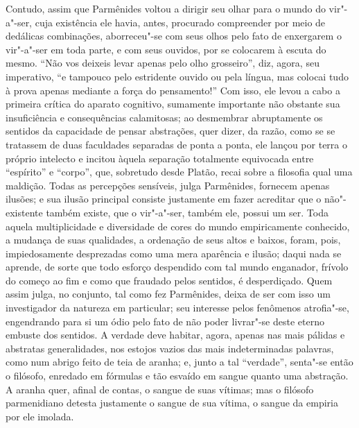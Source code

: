 Contudo, assim que Parmênides voltou a dirigir seu olhar para o mundo do
vir"-a"-ser, cuja existência ele havia, antes, procurado compreender por
meio de dedálicas combinações, aborreceu"-se com seus olhos pelo fato de
enxergarem o vir"-a"-ser em toda parte, e com seus ouvidos, por se
colocarem à escuta do mesmo. ``Não vos deixeis levar apenas pelo olho
grosseiro'', diz, agora, seu imperativo, ``e tampouco pelo estridente
ouvido ou pela língua, mas colocai tudo à prova apenas mediante a força
do pensamento!'' Com isso, ele levou a cabo a primeira crítica do
aparato cognitivo, sumamente importante não obstante sua insuficiência
e consequências calamitosas; ao desmembrar abruptamente os sentidos da
capacidade de pensar abstrações, quer dizer, da razão, como se se tratassem
de duas faculdades separadas de ponta a ponta, ele lançou por terra o
próprio intelecto e incitou àquela separação totalmente equivocada
entre ``espírito'' e ``corpo'', que, sobretudo desde Platão, recai
sobre a filosofia qual uma maldição. Todas as percepções sensíveis,
julga Parmênides, fornecem apenas ilusões; e sua ilusão principal
consiste justamente em fazer acreditar que o não"-existente também
existe, que o vir"-a"-ser, também ele, possui um ser. Toda aquela
multiplicidade e diversidade de cores do mundo empiricamente conhecido,
a mudança de suas qualidades, a ordenação de seus altos e baixos,
foram, pois, impiedosamente desprezadas como uma mera aparência e
ilusão; daqui nada se aprende, de sorte que todo esforço despendido com
tal mundo enganador, frívolo do começo ao fim e como que fraudado pelos
sentidos, é desperdiçado. Quem assim julga, no conjunto, tal como fez
Parmênides, deixa de ser com isso um investigador da natureza em
particular; seu interesse pelos fenômenos atrofia"-se, engendrando para
si um ódio pelo fato de não poder livrar"-se deste eterno embuste dos \label{odio}
sentidos. A verdade deve habitar, agora, apenas nas mais pálidas e
abstratas generalidades, nos estojos vazios das mais indeterminadas
palavras, como num abrigo feito de teia de aranha; e, junto a tal
``verdade'', senta"-se então o filósofo, enredado em fórmulas e tão
esvaído em sangue quanto uma abstração. A aranha quer, afinal de
contas, o sangue de suas vítimas; mas o filósofo parmenidiano detesta
justamente o sangue de sua vítima, o sangue da empiria por ele imolada.

\sectionitem

